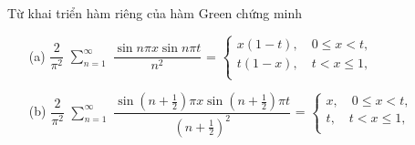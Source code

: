 \documentclass{report}
\newcommand{\dps}{\displaystyle}
\newcommand{\f}[2]{\dfrac{#1}{#2}}
\begin{document}
Từ khai triển hàm riêng của hàm Green chứng minh
\begin{enumerate}
	\item[(a)] $\f{2}{\pi^2}$ 	$\dps\sum_{n = 1}^{\infty}$ $\f{\sin n\pi x \sin n\pi t}{n^2}$ =
	$
	\begin{cases}
		x(1-t) ,\quad 0 \leq x < t,\\
		t(1-x) ,\quad t < x \leq 1,\\
	\end{cases}
	$ 
	\item[(b)] $\f{2}{\pi^2}$ 	$\dps\sum_{n = 1}^{\infty}$ $\f{\sin (n+\frac{1}{2})\pi x \sin (n+\frac{1}{2})\pi t}{(n+\frac{1}{2})^2}$ =
	$
	\begin{cases}
		x ,\quad 0 \leq x < t,\\
		t ,\quad t < x \leq 1,\\
	\end{cases}
	$ 
\end{enumerate}
\end{document}
